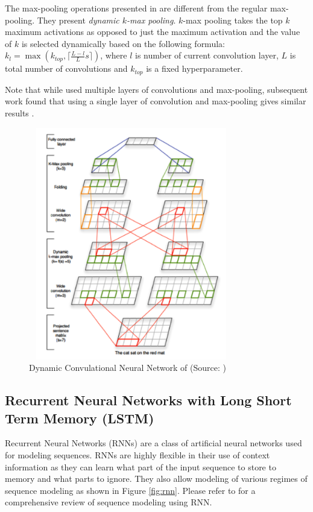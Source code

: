 \documentclass{article} %
\begin{document}
The max-pooling operations presented in \cite{kalchbrenner2014convolutional} are different from the regular max-pooling. They present {\it dynamic $k$-max pooling}. $k$-max pooling takes the top $k$ maximum activations as opposed to just the maximum activation and the value of $k$ is selected dynamically based on the following formula: $k_l = \max \left( k_{top}, 	\lceil \frac{L-l}{L} s\rceil \right)$, where $l$ is number of current convolution layer, $L$ is total number of convolutions and $k_{top}$ is a fixed hyperparameter. 

Note that while \cite{kalchbrenner2014convolutional} used multiple layers of convolutions and max-pooling, subsequent work found that using a single layer of convolution and max-pooling gives similar results \cite{kim2014convolutional} \cite{severynunitn}.

\begin{figure}
	\centering
	\includegraphics[height=4in, width=0.8\textwidth]{figs/DCNN.png}
	\caption{Dynamic Convulational Neural Network of \cite{kalchbrenner2014convolutional} (Source: \cite{kalchbrenner2014convolutional})}
	\label{fig:dcnn}
\end{figure}

\subsection{Recurrent Neural Networks with Long Short Term Memory (LSTM)}
Recurrent Neural Networks (RNNs) are a class of artificial neural networks used for modeling sequences.
RNNs are highly flexible in their use of context information as they can learn what part of the input sequence to store to memory and what parts to ignore. They also allow modeling of various regimes of sequence modeling as shown in Figure \ref{fig:rnn}. Please refer to \cite{graves2012supervised} for a comprehensive review of sequence modeling using RNN.
\end{document}
